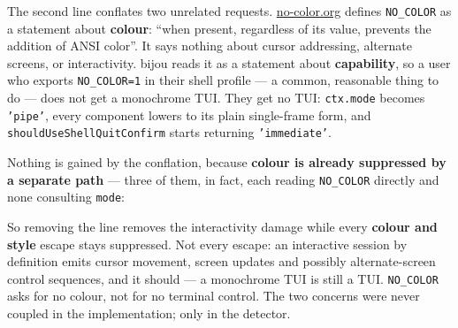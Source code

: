 

The second line conflates two unrelated requests. \href{https://no-color.org}{no-color.org} defines \texttt{N\allowbreak{}O\allowbreak{}\_\allowbreak{}C\allowbreak{}O\allowbreak{}L\allowbreak{}O\allowbreak{}R} as a statement about \textbf{colour}: ``when present, regardless of its value, prevents the addition of ANSI color''. It says nothing about cursor addressing, alternate screens, or interactivity. bijou reads it as a statement about \textbf{capability}, so a user who exports \texttt{N\allowbreak{}O\allowbreak{}\_\allowbreak{}C\allowbreak{}O\allowbreak{}L\allowbreak{}O\allowbreak{}R\allowbreak{}=\allowbreak{}1} in their shell profile --- a common, reasonable thing to do --- does not get a monochrome TUI. They get no TUI: \texttt{c\allowbreak{}t\allowbreak{}x\allowbreak{}.\allowbreak{}m\allowbreak{}o\allowbreak{}d\allowbreak{}e} becomes \texttt{'\allowbreak{}p\allowbreak{}i\allowbreak{}p\allowbreak{}e\allowbreak{}'}, every component lowers to its plain single-frame form, and \texttt{s\allowbreak{}h\allowbreak{}o\allowbreak{}u\allowbreak{}l\allowbreak{}d\allowbreak{}U\allowbreak{}s\allowbreak{}e\allowbreak{}S\allowbreak{}h\allowbreak{}e\allowbreak{}l\allowbreak{}l\allowbreak{}Q\allowbreak{}u\allowbreak{}i\allowbreak{}t\allowbreak{}C\allowbreak{}o\allowbreak{}n\allowbreak{}f\allowbreak{}i\allowbreak{}r\allowbreak{}m} starts returning \texttt{'\allowbreak{}i\allowbreak{}m\allowbreak{}m\allowbreak{}e\allowbreak{}d\allowbreak{}i\allowbreak{}a\allowbreak{}t\allowbreak{}e\allowbreak{}'}.

Nothing is gained by the conflation, because \textbf{colour is already suppressed by a separate path} --- three of them, in fact, each reading \texttt{N\allowbreak{}O\allowbreak{}\_\allowbreak{}C\allowbreak{}O\allowbreak{}L\allowbreak{}O\allowbreak{}R} directly and none consulting \texttt{m\allowbreak{}o\allowbreak{}d\allowbreak{}e}:



So removing the line removes the interactivity damage while every \textbf{colour and style} escape stays suppressed. Not every escape: an interactive session by definition emits cursor movement, screen updates and possibly alternate-screen control sequences, and it should --- a monochrome TUI is still a TUI. \texttt{N\allowbreak{}O\allowbreak{}\_\allowbreak{}C\allowbreak{}O\allowbreak{}L\allowbreak{}O\allowbreak{}R} asks for no colour, not for no terminal control. The two concerns were never coupled in the implementation; only in the detector.

